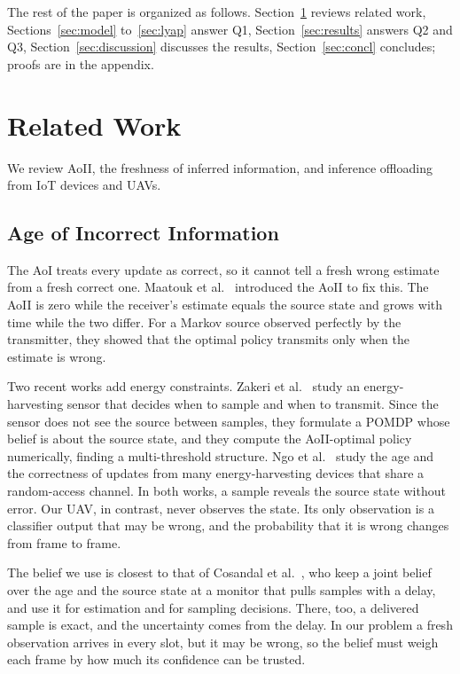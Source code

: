 \documentclass[5p,twocolumn]{elsarticle}
\theoremstyle{remark}
\begin{document}
The rest of the paper is organized as follows. Section~\ref{sec:related} reviews related work, Sections~\ref{sec:model} to~\ref{sec:lyap} answer Q1, Section~\ref{sec:results} answers Q2 and Q3, Section~\ref{sec:discussion} discusses the results, Section~\ref{sec:concl} concludes; proofs are in the appendix.
\section{Related Work}\label{sec:related}
We review AoII, the freshness of inferred information, and inference offloading from IoT devices and UAVs.

\subsection{Age of Incorrect Information}
The AoI treats every update as correct, so it cannot tell a fresh wrong estimate from a fresh correct one. Maatouk et al.~\cite{maatouk2020aoii} introduced the AoII to fix this. The AoII is zero while the receiver's estimate equals the source state and grows with time while the two differ. For a Markov source observed perfectly by the transmitter, they showed that the optimal policy transmits only when the estimate is wrong.

Two recent works add energy constraints. Zakeri et al.~\cite{zakeri2023aoiieh} study an energy-harvesting sensor that decides when to sample and when to transmit. Since the sensor does not see the source between samples, they formulate a POMDP whose belief is about the source state, and they compute the AoII-optimal policy numerically, finding a multi-threshold structure. Ngo et al.~\cite{ngo2025eh} study the age and the correctness of updates from many energy-harvesting devices that share a random-access channel. In both works, a sample reveals the source state without error. Our UAV, in contrast, never observes the state. Its only observation is a classifier output that may be wrong, and the probability that it is wrong changes from frame to frame.

The belief we use is closest to that of Cosandal et al.~\cite{cosandal2024joint}, who keep a joint belief over the age and the source state at a monitor that pulls samples with a delay, and use it for estimation and for sampling decisions. There, too, a delivered sample is exact, and the uncertainty comes from the delay. In our problem a fresh observation arrives in every slot, but it may be wrong, so the belief must weigh each frame by how much its confidence can be trusted.
\end{document}
